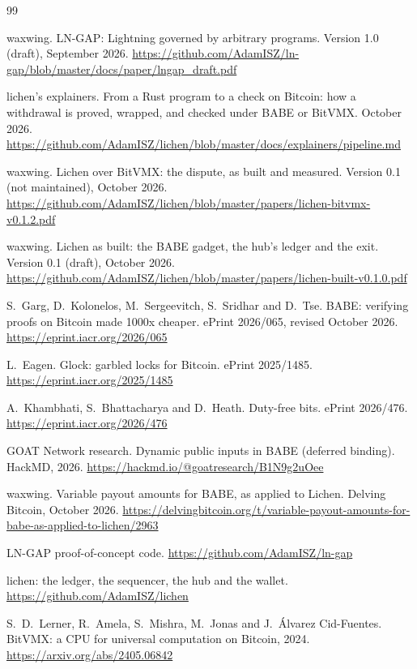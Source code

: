 \documentclass[11pt]{article}
\begin{document}
\begin{thebibliography}{99}

 waxwing. LN-GAP: Lightning governed by arbitrary programs. Version 1.0 (draft), September 2026. \url{https://github.com/AdamISZ/ln-gap/blob/master/docs/paper/lngap_draft.pdf}

 lichen's explainers. From a Rust program to a check on Bitcoin: how a withdrawal is proved, wrapped, and checked under BABE or BitVMX. October 2026. \url{https://github.com/AdamISZ/lichen/blob/master/docs/explainers/pipeline.md}

 waxwing. Lichen over BitVMX: the dispute, as built and measured. Version 0.1 (not maintained), October 2026. \url{https://github.com/AdamISZ/lichen/blob/master/papers/lichen-bitvmx-v0.1.2.pdf}

 waxwing. Lichen as built: the BABE gadget, the hub's ledger and the exit. Version 0.1 (draft), October 2026. \url{https://github.com/AdamISZ/lichen/blob/master/papers/lichen-built-v0.1.0.pdf}

 S.~Garg, D.~Kolonelos, M.~Sergeevitch, S.~Sridhar and D.~Tse. BABE: verifying proofs on Bitcoin made 1000x cheaper. ePrint 2026/065, revised October 2026. \url{https://eprint.iacr.org/2026/065}

 L.~Eagen. Glock: garbled locks for Bitcoin. ePrint 2025/1485. \url{https://eprint.iacr.org/2025/1485}

 A.~Khambhati, S.~Bhattacharya and D.~Heath. Duty-free bits. ePrint 2026/476. \url{https://eprint.iacr.org/2026/476}

 GOAT Network research. Dynamic public inputs in BABE (deferred binding). HackMD, 2026. \url{https://hackmd.io/@goatresearch/B1N9g2uOee}

 waxwing. Variable payout amounts for BABE, as applied to Lichen. Delving Bitcoin, October 2026. \url{https://delvingbitcoin.org/t/variable-payout-amounts-for-babe-as-applied-to-lichen/2963}

 LN-GAP proof-of-concept code. \url{https://github.com/AdamISZ/ln-gap}

 lichen: the ledger, the sequencer, the hub and the wallet. \url{https://github.com/AdamISZ/lichen}

 S.~D.~Lerner, R.~Amela, S.~Mishra, M.~Jonas and J.~\'Alvarez Cid-Fuentes. BitVMX: a CPU for universal computation on Bitcoin, 2024. \url{https://arxiv.org/abs/2405.06842}


\end{thebibliography}
\end{document}
